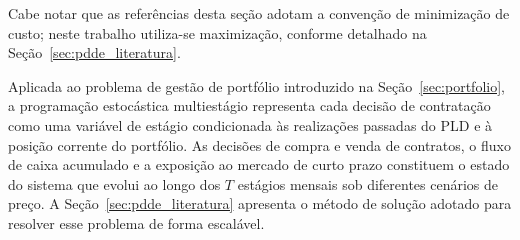 Cabe notar que as referências desta seção adotam a convenção de minimização de custo; neste trabalho utiliza-se maximização, conforme detalhado na Seção~\ref{sec:pdde_literatura}.

Aplicada ao problema de gestão de portfólio introduzido na Seção~\ref{sec:portfolio}, a programação estocástica multiestágio representa cada decisão de contratação como uma variável de estágio condicionada às realizações passadas do PLD e à posição corrente do portfólio. As decisões de compra e venda de contratos, o fluxo de caixa acumulado e a exposição ao mercado de curto prazo constituem o estado do sistema que evolui ao longo dos $T$ estágios mensais sob diferentes cenários de preço. A Seção~\ref{sec:pdde_literatura} apresenta o método de solução adotado para resolver esse problema de forma escalável.
